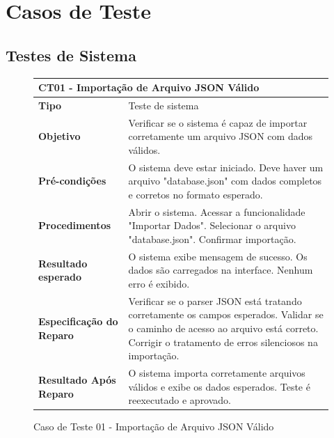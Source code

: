 \section{Casos de Teste}

\subsection*{Testes de Sistema}


\begin{figure}[H]
    \centering
\begin{longtable}{|p{}|p{}|}
\hline
\multicolumn{2}{|l|}{\textbf{CT01 - Importação de Arquivo JSON Válido}} \\
\hline
\textbf{Tipo} & Teste de sistema \\
\hline
\textbf{Objetivo} & Verificar se o sistema é capaz de importar corretamente um arquivo JSON com dados válidos. \\
\hline
\textbf{Pré-condições} & O sistema deve estar iniciado. Deve haver um arquivo "database.json" com dados completos e corretos no formato esperado.  \\
\hline
\textbf{Procedimentos} & Abrir o sistema. Acessar a funcionalidade "Importar Dados". Selecionar o arquivo "database.json". Confirmar importação. \\
\hline
\textbf{Resultado esperado} & O sistema exibe mensagem de sucesso. Os dados são carregados na interface. Nenhum erro é exibido. \\
\hline
\textbf{Especificação do Reparo} & Verificar se o parser JSON está tratando corretamente os campos esperados. Validar se o caminho de acesso ao arquivo está correto. Corrigir o tratamento de erros silenciosos na importação. \\
\hline
\textbf{Resultado Após Reparo} & O sistema importa corretamente arquivos válidos e exibe os dados esperados. Teste é reexecutado e aprovado. \\
\hline
\end{longtable}
\caption{Caso de Teste 01 - Importação de Arquivo JSON Válido}
\label{fig_ct01_importacao_json_valido}
\end{figure}

